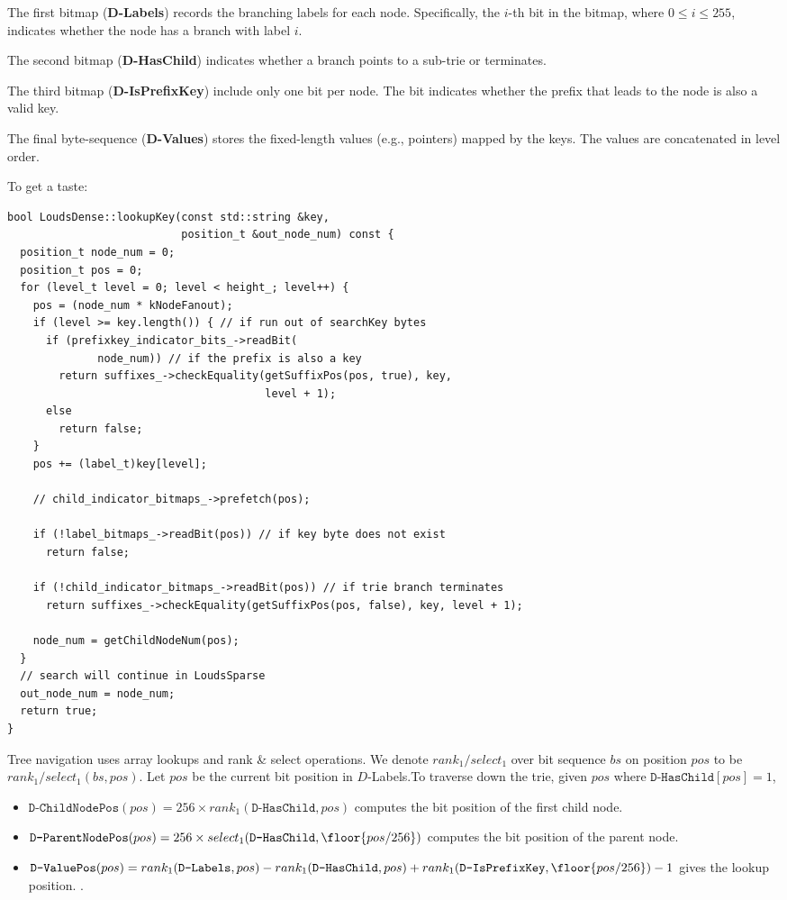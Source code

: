 \documentclass[11pt]{article}
\begin{document}
The first bitmap (\textbf{D-Labels}) records the branching labels for each node. Specifically, the \(i\)-th bit
in the bitmap, where \(0\le i\le 255\), indicates whether the node has a branch with label \(i\).

The second bitmap (\textbf{D-HasChild}) indicates whether a branch points to a sub-trie or terminates.

The third bitmap (\textbf{D-IsPrefixKey}) include only one bit per node. The bit indicates whether the prefix
that leads to the node is also a valid key.

The final byte-sequence (\textbf{D-Values}) stores the fixed-length values (e.g., pointers) mapped by the keys.
The values are concatenated in level order.


To get a taste:
\begin{verbatim}
bool LoudsDense::lookupKey(const std::string &key,
                           position_t &out_node_num) const {
  position_t node_num = 0;
  position_t pos = 0;
  for (level_t level = 0; level < height_; level++) {
    pos = (node_num * kNodeFanout);
    if (level >= key.length()) { // if run out of searchKey bytes
      if (prefixkey_indicator_bits_->readBit(
              node_num)) // if the prefix is also a key
        return suffixes_->checkEquality(getSuffixPos(pos, true), key,
                                        level + 1);
      else
        return false;
    }
    pos += (label_t)key[level];

    // child_indicator_bitmaps_->prefetch(pos);

    if (!label_bitmaps_->readBit(pos)) // if key byte does not exist
      return false;

    if (!child_indicator_bitmaps_->readBit(pos)) // if trie branch terminates
      return suffixes_->checkEquality(getSuffixPos(pos, false), key, level + 1);

    node_num = getChildNodeNum(pos);
  }
  // search will continue in LoudsSparse
  out_node_num = node_num;
  return true;
}
\end{verbatim}

Tree navigation uses array lookups and rank \& select operations. We denote \(rank_1/select_1\) over
bit sequence \(bs\) on position \(pos\) to be \(rank_1/select_1(bs,pos)\). Let \(pos\) be the current
bit position in \(D\)-Labels.To traverse down the trie, given \(pos\) where \(\texttt{D-HasChild}[pos]=1\),
\begin{itemize}
\item \(\texttt{D-ChildNodePos}(pos)=256\times rank_1(\texttt{D-HasChild},pos)\) computes the bit position of the first
child node.
\item \(\texttt{D-ParentNodePos}(pos)=256\times select_1(\texttt{D-HasChild}, \floor{pos/256})\) computes
the bit position of the parent node.
\item \(\texttt{D-ValuePos}(pos)=rank_1(\texttt{D-Labels},pos)-rank_1(\texttt{D-HasChild},pos)+rank_1(\texttt{D-IsPrefixKey},\floor{pos/256})-1\)
gives the lookup position. .
\end{itemize}
\end{document}
